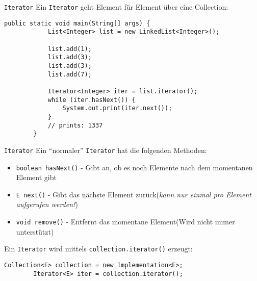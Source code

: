 \begin{frame}[fragile]{\texttt{Iterator}}
    Ein \texttt{Iterator} geht Element für Element über eine Collection:
    \begin{lstlisting}[basicstyle=\ttfamily\scriptsize,gobble=8]
        public static void main(String[] args) {
            List<Integer> list = new LinkedList<Integer>();

            list.add(1);
            list.add(3);
            list.add(3);
            list.add(7);

            Iterator<Integer> iter = list.iterator();
            while (iter.hasNext()) {
                System.out.print(iter.next());
            }
            // prints: 1337
        }
    \end{lstlisting}
\end{frame}

\begin{frame}[fragile]{\texttt{Iterator}}
    Ein \enquote{normaler} \texttt{Iterator} hat die folgenden Methoden:
    \begin{itemize}
        \item \texttt{boolean hasNext()} - Gibt an, ob es noch Elemente nach dem momentanen Element gibt
        \item \texttt{E next()} - Gibt das nächste Element zurück(\textit{kann nur einmal pro Element aufgerufen werden!})
        \item \texttt{void remove()} - Entfernt das momentane Element(Wird nicht immer unterstützt)
    \end{itemize}
    Ein \texttt{Iterator} wird mittels \texttt{collection.iterator()} erzeugt:
    \begin{lstlisting}[basicstyle=\ttfamily\scriptsize,gobble=8]
        Collection<E> collection = new Implementation<E>;
        Iterator<E> iter = collection.iterator();
    \end{lstlisting}
\end{frame}

